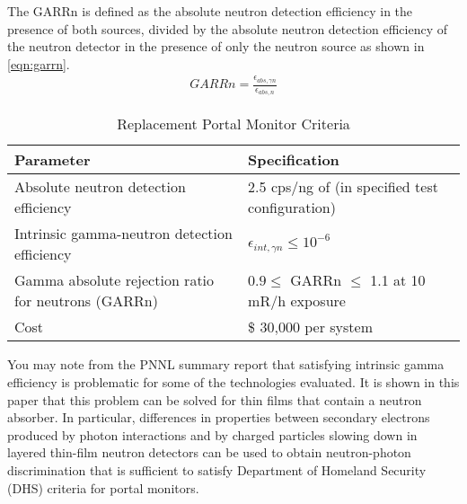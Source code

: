 \documentclass[draftcls,onecolumn]{IEEEtran}
\begin{document}
The GARRn is defined as the absolute neutron detection efficiency in the presence of both sources, divided by the absolute neutron detection efficiency of the neutron detector in the presence of only the neutron source as shown in \eqref{eqn:garrn}\cite{kouzes_neutron_1999}.
\begin{align}
  \label{eqn:garrn}
  GARRn = \frac{ \epsilon_{abs,\gamma n}}{\epsilon_{abs,n}}
\end{align}
\begin{table}
  \centering
	\caption{Replacement Portal Monitor Criteria}
	\begin{tabular}{m{2.5cm} m{2.5cm} }
	Parameter & Specification \\
	\hline
	\hline
	Absolute neutron detection efficiency & 2.5 cps/ng of \iso[252]{Cf} (in specified test configuration) \\
	Intrinsic gamma-neutron detection efficiency & $ \epsilon_{int,\gamma n}\leq 10^{-6}$ \\
	Gamma absolute rejection ratio for neutrons (GARRn) & $ 0.9 \leq \text{ GARRn }\leq$ 1.1 at 10 mR/h exposure \\
	Cost &  \$ 30,000 per system \\
	\end{tabular}
	\label{tab:DHSCritera}
\end{table}

You may note from the PNNL summary report \cite{pnnl_18471}  that satisfying intrinsic gamma efficiency is problematic for some of the technologies evaluated.
It is shown in this paper that this problem can be solved for thin films that contain a neutron absorber.
In particular, differences in properties between secondary electrons produced by photon interactions and by charged particles slowing down in layered thin-film neutron detectors can be used to obtain neutron-photon discrimination that is sufficient to satisfy Department of Homeland Security (DHS) criteria for portal monitors.  


\end{document}
